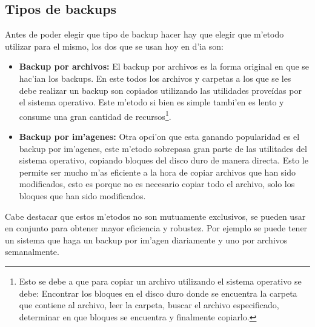 \documentclass[11pt]{article}
\begin{document}
	 \subsection{Tipos de backups}
		Antes de poder elegir que tipo de backup hacer hay que elegir que m'etodo utilizar para el mismo, los dos que se usan hoy en d'ia son:
		\begin{itemize}
			\item \textbf{Backup por archivos:} El backup por archivos es la forma original en que se hac'ian los backups. En este todos los archivos y carpetas a los que se les debe realizar un backup son copiados utilizando las utilidades proveídas por el sistema operativo. Este m'etodo si bien es simple tambi'en es lento y consume una gran cantidad de recursos\footnote{Esto se debe a que para copiar un archivo utilizando el sistema operativo se debe: Encontrar los bloques en el disco duro donde se encuentra la carpeta que contiene al archivo, leer la carpeta, buscar el archivo especificado, determinar en que bloques se encuentra y finalmente copiarlo.}.
			\item \textbf{Backup por im'agenes:} Otra opci'on que esta ganando popularidad es el backup por im'agenes, este m'etodo sobrepasa gran parte de las utilitades del sistema operativo, copiando bloques del disco duro de manera directa. Esto le permite ser mucho m'as eficiente a la hora de copiar archivos que han sido modificados, esto es porque no es necesario copiar todo el archivo, solo los bloques que han sido modificados. 
		\end{itemize}

		Cabe destacar que estos m'etodos no son mutuamente exclusivos, se pueden usar en conjunto para obtener mayor eficiencia y robustez. Por ejemplo se puede tener un sistema que haga un backup por im'agen diariamente y uno por archivos semanalmente.
\end{document}

